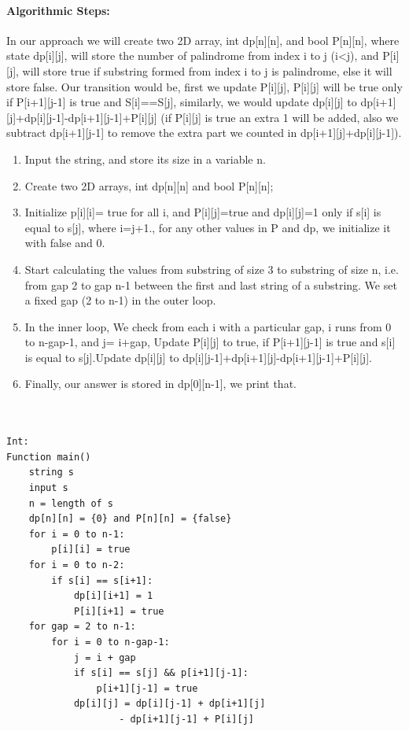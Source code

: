 \documentclass[10pt]{article}
\begin{document}
\begin{multicols*}{2}
\paragraph{Algorithmic Steps:}

In our approach we will create two 2D array, int dp[n][n], and bool P[n][n], where state dp[i][j], will store the number of palindrome from index i to j (i<j), and P[i][j], will store true if substring formed from index i to j is palindrome, else it will store false. Our transition would be, first we update P[i][j], P[i][j] will be true only if P[i+1][j-1] is true and S[i]==S[j], similarly, we would update dp[i][j] to dp[i+1][j]+dp[i][j-1]-dp[i+1][j-1]+P[i][j] (if P[i][j] is true an extra 1 will be added, also we subtract dp[i+1][j-1] to remove the extra part we counted in dp[i+1][j]+dp[i][j-1]).
\begin{enumerate}

\item	Input the string, and store its size in a variable n.
\item	Create two 2D arrays, int dp[n][n] and bool P[n][n];
\item   Initialize p[i][i]= true for all i, and P[i][j]=true and dp[i][j]=1 only if s[i] is equal to s[j], where i=j+1., for any other values in P and dp, we initialize it with false and 0.
\item	Start calculating the values from substring of size 3 to substring of size n, i.e. from gap 2 to gap n-1 between the first and last string of a substring. We set a fixed gap (2 to n-1) in the outer loop.
\item	In the inner loop, We check from each i with a particular gap, i runs from 0 to n-gap-1, and j= i+gap, Update P[i][j] to true, if P[i+1][j-1] is true and s[i] is equal to s[j].Update dp[i][j] to dp[i][j-1]+dp[i+1][j]-dp[i+1][j-1]+P[i][j].
\item	Finally, our answer is stored in dp[0][n-1], we print that.
\\\
\end{enumerate}


\begin{lstlisting}

Int:
Function main()
    string s
    input s
    n = length of s
    dp[n][n] = {0} and P[n][n] = {false}
    for i = 0 to n-1:
        p[i][i] = true
    for i = 0 to n-2:
        if s[i] == s[i+1]:
            dp[i][i+1] = 1
            P[i][i+1] = true
    for gap = 2 to n-1:
        for i = 0 to n-gap-1:
            j = i + gap
            if s[i] == s[j] && p[i+1][j-1]:
                p[i+1][j-1] = true
            dp[i][j] = dp[i][j-1] + dp[i+1][j]
                    - dp[i+1][j-1] + P[i][j]
    

\end{lstlisting}
\end{multicols*}
\end{document}
